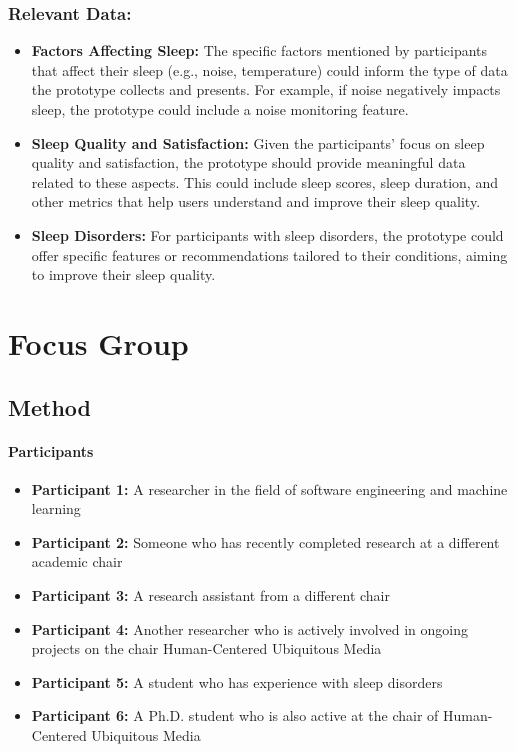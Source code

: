 \documentclass[
  a4paper,  %
  twoside,  %
  bibliography=totoc,
  headsepline,
  cleardoublepage=empty,
  parskip=half,
  draft=false
]{scrbook}
\begin{document}
\subsection{Relevant Data:}
\begin{itemize}
    \item \textbf{Factors Affecting Sleep:} The specific factors mentioned by participants that affect their sleep (e.g., noise, temperature) could inform the type of data the prototype collects and presents. For example, if noise negatively impacts sleep, the prototype could include a noise monitoring feature.
    \item \textbf{Sleep Quality and Satisfaction:} Given the participants' focus on sleep quality and satisfaction, the prototype should provide meaningful data related to these aspects. This could include sleep scores, sleep duration, and other metrics that help users understand and improve their sleep quality.
    \item \textbf{Sleep Disorders:} For participants with sleep disorders, the prototype could offer specific features or recommendations tailored to their conditions, aiming to improve their sleep quality.
\end{itemize}


\chapter{Focus Group}
\section{Method}
\subsubsection{Participants}

\begin{itemize}
    \item \textbf{Participant 1:} A researcher in the field of software engineering and machine learning
    \item \textbf{Participant 2:} Someone who has recently completed research at a different academic chair
    \item \textbf{Participant 3:} A research assistant from a different chair
    \item \textbf{Participant 4:} Another researcher who is actively involved in ongoing projects on the chair Human-Centered Ubiquitous Media
    \item \textbf{Participant 5:} A student who has experience with sleep disorders
    \item \textbf{Participant 6:} A Ph.D. student who is also active at the chair of Human-Centered Ubiquitous Media
\end{itemize}
\end{document}
